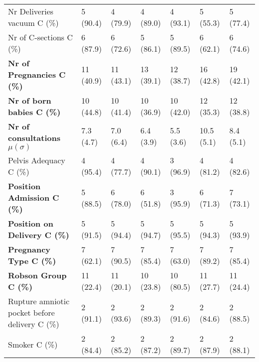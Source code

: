 \begin{tabular}{LLLLLLL}
   \begin{minipage}{3.9cm}Nr Deliveries vacuum C (\%)\vspace{1mm}\end{minipage} &  5 (90.4) & 4 (79.9) & 4 (89.0) & 4 (93.1) & 5 (55.3) & 5 (77.4) \\
   
   Nr of C-sections C (\%) & 6 (87.9) & 6 (72.6) & 5 (86.1) & 5 (89.5) & 6 (62.1) & 6 (74.6) \\
   
   \textbf{Nr of Pregnancies C (\%)} &  11 (40.9) & 11 (43.1) & 13 (39.1) & 12 (38.7) & 16 (42.8) & 19 (42.1) \\
   
   \textbf{Nr of born babies C (\%)} & 10 (44.8) & 10 (41.4) & 10 (36.9) & 10 (42.0) & 12 (35.3) & 12 (38.8) \\
   
   \textbf{Nr of consultations $\mu (\sigma)$ } &  7.3 (4.7) & 7.0 (6.4) & 6.4 (3.9) & 5.5 (3.6) & 10.5 (5.1) & 8.4 (5.1) \\
   
   Pelvis Adequacy C (\%) &4 (95.4) & 4 (77.7) & 4 (90.1) & 3 (96.9) & 4 (81.2) & 4 (82.6) \\
   
   \textbf{Position Admission C (\%)}  &  5 (88.5) & 6 (78.0) & 6 (51.8) & 3 (95.9) & 6 (71.3) & 7 (73.1) \\
   
   
   \textbf{Position on Delivery C (\%)} &5 (91.5) & 5 (94.4) & 5 (94.7) & 5 (95.5) & 5 (94.3) & 5 (93.9) \\
   
   \textbf{Pregnancy Type C (\%)} &  7 (62.1) & 7 (90.5) & 7 (85.4) & 7 (63.0) & 7 (89.2) & 7 (85.4) \\
   
   \textbf{Robson Group C (\%)} & 11 (22.4) & 11 (20.1) & 10 (23.8) & 10 (80.5) & 11 (27.7) & 11 (24.4) \\
   
   \begin{minipage}{3.7cm}Rupture amniotic pocket before delivery C (\%)\end{minipage} &  2 (91.1) & 2 (93.6) & 2 (89.3) & 2 (91.6) & 2 (84.6) & 2 (88.5) \\
   
   Smoker C (\%) & 2 (84.4) & 2 (85.2) & 2 (87.2) & 2 (89.7) & 2 (87.9) & 2 (88.1) \\
   

\end{tabular}
